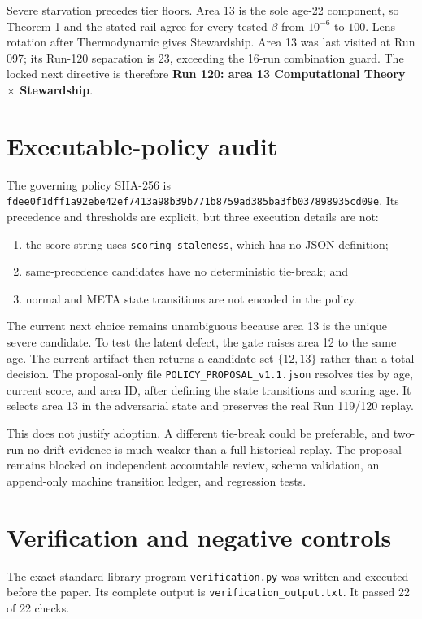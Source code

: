 \documentclass[10pt]{article}
\begin{document}
Severe starvation precedes tier floors.  Area 13 is the sole age-22 component,
so Theorem 1 and the stated rail agree for every tested $\beta$ from $10^{-6}$
to $100$.  Lens rotation after Thermodynamic gives Stewardship.  Area 13 was
last visited at Run 097; its Run-120 separation is 23, exceeding the 16-run
combination guard.  The locked next directive is therefore
\textbf{Run 120: area 13 Computational Theory $\times$ Stewardship}.

\section{Executable-policy audit}

The governing policy SHA-256 is
\texttt{fdee0f1dff1a92ebe42ef7413a98b39b771b8759ad385ba3fb037898935cd09e}.
Its precedence and thresholds are explicit, but three execution details are not:

\begin{enumerate}
\item the score string uses \texttt{scoring\_staleness}, which has no JSON
definition;
\item same-precedence candidates have no deterministic tie-break; and
\item normal and META state transitions are not encoded in the policy.
\end{enumerate}

The current next choice remains unambiguous because area 13 is the unique
severe candidate.  To test the latent defect, the gate raises area 12 to the
same age.  The current artifact then returns a candidate set $\{12,13\}$ rather
than a total decision.  The proposal-only file
\texttt{POLICY\_PROPOSAL\_v1.1.json} resolves ties by age, current score, and
area ID, after defining the state transitions and scoring age.  It selects area
13 in the adversarial state and preserves the real Run 119/120 replay.

This does not justify adoption.  A different tie-break could be preferable,
and two-run no-drift evidence is much weaker than a full historical replay.
The proposal remains blocked on independent accountable review, schema
validation, an append-only machine transition ledger, and regression tests.

\section{Verification and negative controls}

The exact standard-library program \texttt{verification.py} was written and
executed before the paper.  Its complete output is
\texttt{verification\_output.txt}.  It passed 22 of 22 checks.
\end{document}
